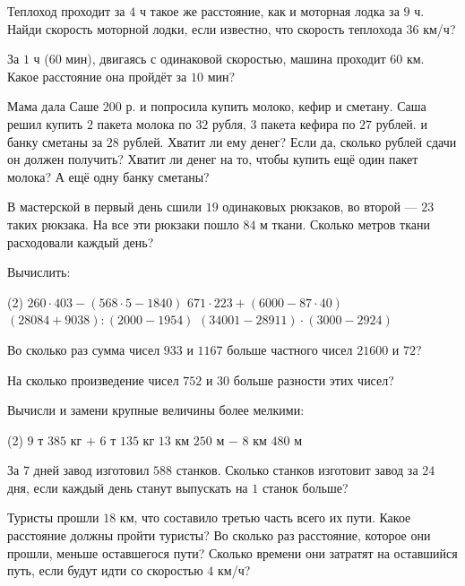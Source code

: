 \begin{class}[number=3]
	\begin{listofex}
		\item Теплоход проходит за \( 4 \) ч такое же расстояние, как и моторная лодка за \( 9 \) ч. Найди скорость моторной лодки, если известно, что скорость теплохода \( 36 \) км/ч?
		\item За \( 1 \) ч (\( 60 \) мин), двигаясь с одинаковой скоростью, машина проходит \( 60 \) км. Какое расстояние она пройдёт за \( 10 \) мин?
		\item Мама дала Саше \( 200 \) р. и попросила купить молоко, кефир и сметану. Саша решил купить \( 2 \) пакета молока по \( 32 \) рубля, \( 3 \) пакета кефира по \( 27 \) рублей. и банку сметаны за \( 28 \) рублей. Хватит ли ему денег? Если да, сколько рублей сдачи он должен получить? Хватит ли денег на то, чтобы купить ещё один пакет молока? А ещё одну банку сметаны?
		\item В мастерской в первый день сшили \( 19 \) одинаковых рюкзаков, во второй --- \( 23 \) таких рюкзака. На все эти рюкзаки пошло \( 84 \) м ткани. Сколько метров ткани расходовали каждый день?
		\item Вычислить:
		\begin{tasks}(2)
			\task \( 260\cdot403-(568\cdot5-1840) \)
			\task \( 671\cdot223+(6000-87\cdot40) \)
			\task \( (28084+9038):(2000-1954) \)
			\task \( (34001-28911)\cdot(3000-2924) \)
		\end{tasks}
		\item Во сколько раз сумма чисел \( 933 \) и \( 1167 \) больше частного чисел \( 21600 \) и \( 72 \)?
		\item На сколько произведение чисел \( 752 \) и \( 30 \) больше разности этих чисел?
		\item Вычисли и замени крупные величины более мелкими:
		\begin{tasks}(2)
			\task \( 9 \) т \( 385 \) кг \( + \) \( 6 \) т \( 135 \) кг
			\task \( 13 \) км \( 250 \) м \( - \) \( 8 \) км \( 480 \) м
		\end{tasks}
		\item За \( 7 \) дней завод изготовил \( 588 \) станков. Сколько станков изготовит завод за \( 24 \) дня, если каждый день станут выпускать на \( 1 \) станок больше?
		\item Туристы прошли \( 18 \) км, что составило третью часть всего их пути. Какое расстояние должны пройти туристы? Во сколько раз расстояние, которое они прошли, меньше оставшегося пути? Сколько времени они затратят на оставшийся путь, если будут идти со скоростью \( 4 \) км/ч?
	\end{listofex}
\end{class}

